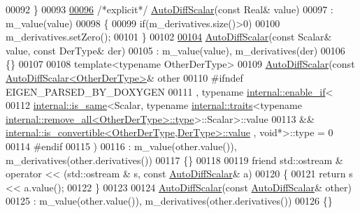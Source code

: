 \begin{DoxyCode}
00092     \}
00093 
\hyperlink{class_eigen_1_1_auto_diff_scalar_a14e0f5ecc595deb05aaf336f5a81b861}{00096}     \textcolor{comment}{/*explicit*/} \hyperlink{class_eigen_1_1_auto_diff_scalar_a14e0f5ecc595deb05aaf336f5a81b861}{AutoDiffScalar}(\textcolor{keyword}{const} Real& value)
00097       : m\_value(value)
00098     \{
00099       \textcolor{keywordflow}{if}(m\_derivatives.size()>0)
00100         m\_derivatives.setZero();
00101     \}
00102 
\hyperlink{class_eigen_1_1_auto_diff_scalar_a09641114cbb3b98a1132b82dff5939e3}{00104}     \hyperlink{class_eigen_1_1_auto_diff_scalar_a09641114cbb3b98a1132b82dff5939e3}{AutoDiffScalar}(\textcolor{keyword}{const} Scalar& value, \textcolor{keyword}{const} DerType& der)
00105       : m\_value(value), m\_derivatives(der)
00106     \{\}
00107 
00108     \textcolor{keyword}{template}<\textcolor{keyword}{typename} OtherDerType>
00109     \hyperlink{class_eigen_1_1_auto_diff_scalar}{AutoDiffScalar}(\textcolor{keyword}{const} \hyperlink{class_eigen_1_1_auto_diff_scalar}{AutoDiffScalar<OtherDerType>}& other
00110 #ifndef EIGEN\_PARSED\_BY\_DOXYGEN
00111     , \textcolor{keyword}{typename} \hyperlink{struct_eigen_1_1internal_1_1enable__if}{internal::enable\_if}<
00112             \hyperlink{struct_eigen_1_1internal_1_1is__same}{internal::is\_same}<Scalar, \textcolor{keyword}{typename} \hyperlink{struct_eigen_1_1internal_1_1traits}{internal::traits}<\textcolor{keyword}{typename} 
      \hyperlink{group___sparse_core___module}{internal::remove\_all<OtherDerType>::type}>::Scalar>::value
00113         &&  \hyperlink{struct_eigen_1_1internal_1_1is__convertible}{internal::is\_convertible<OtherDerType,DerType>::value}
       , \textcolor{keywordtype}{void}*>::type = 0
00114 #endif
00115     )
00116       : m\_value(other.value()), m\_derivatives(other.derivatives())
00117     \{\}
00118 
00119     \textcolor{keyword}{friend}  std::ostream & operator << (std::ostream & s, \textcolor{keyword}{const} \hyperlink{class_eigen_1_1_auto_diff_scalar}{AutoDiffScalar}& a)
00120     \{
00121       \textcolor{keywordflow}{return} s << a.value();
00122     \}
00123 
00124     \hyperlink{class_eigen_1_1_auto_diff_scalar}{AutoDiffScalar}(\textcolor{keyword}{const} \hyperlink{class_eigen_1_1_auto_diff_scalar}{AutoDiffScalar}& other)
00125       : m\_value(other.value()), m\_derivatives(other.derivatives())
00126     \{\}

\end{DoxyCode}
